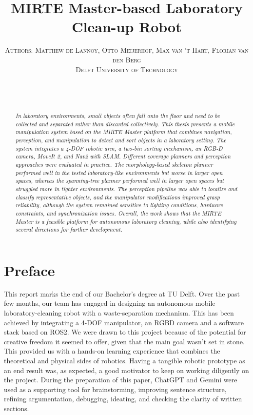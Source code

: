 \documentclass{article}
\title{MIRTE Master-based Laboratory Clean-up Robot}
\date{%
  \ThesisExtraInfo\\[1.5em]
  \displaydate{articleDate}\\[1.5em]
}
\author{
\textsc{
\small{Authors: Matthew de Lannoy, Otto Meijerhof, Max van 't Hart, Florian van den Berg}%
\\
\small{Delft University of Technology}
}}
\begin{document}
\maketitle
\vfill

\begin{abstract}
\textit{In laboratory environments, small objects often fall onto the floor and need to be collected and separated rather than discarded collectively. This thesis presents a mobile manipulation system based on the MIRTE Master platform that combines navigation, perception, and manipulation to detect and sort objects in a laboratory setting. The system integrates a 4-DOF robotic arm, a two-bin sorting mechanism, an RGB-D camera, MoveIt 2, and Nav2 with SLAM. Different coverage planners and perception approaches were evaluated in practice. The morphology-based skeleton planner performed well in the tested laboratory-like environments but worse in larger open spaces, whereas the spanning-tree planner performed well in larger open spaces but struggled more in tighter environments. The perception pipeline was able to localize and classify representative objects, and the manipulator modifications improved grasp reliability, although the system remained sensitive to lighting conditions, hardware constraints, and synchronization issues. Overall, the work shows that the MIRTE Master is a feasible platform for autonomous laboratory cleaning, while also identifying several directions for further development.}
\end{abstract}

\clearpage

\setcounter{tocdepth}{2}

  \setcounter{tocdepth}{2}

\section*{Preface}
This report marks the end of our Bachelor's degree at TU Delft. Over the past few months, our team has engaged in designing an autonomous mobile laboratory-cleaning robot with a waste-separation mechanism. This has been achieved by integrating a 4-DOF manipulator, an RGBD camera and a software stack based on ROS2. We were drawn to this project because of the potential for creative freedom it seemed to offer, given that the main goal wasn't set in stone. This provided us with a hands-on learning experience that combines the theoretical and physical sides of robotics. Having a tangible robotic prototype as an end result was, as expected, a good motivator to keep on working diligently on the project. During the preparation of this paper, ChatGPT and Gemini were used as a supporting tool for
brainstorming, improving sentence structure, refining argumentation, debugging, ideating, and checking the clarity of written
sections.
\end{document}
